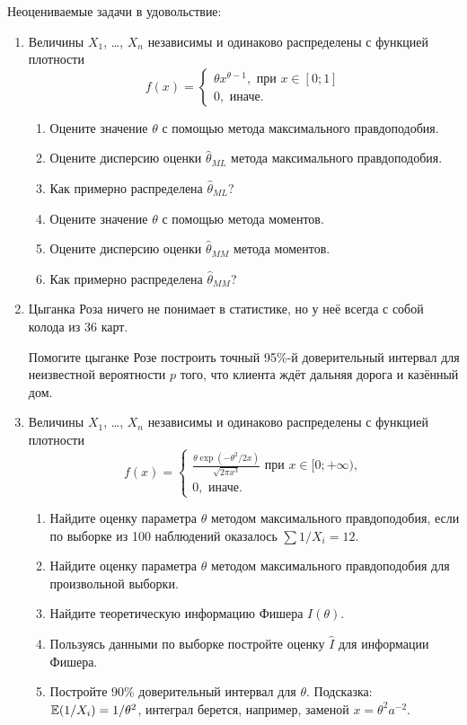 Неоцениваемые задачи в удовольствие:

\begin{enumerate}[resume]
    \item Величины  $X_1$, \ldots, $X_n$ независимы и одинаково распределены с функцией плотности 
    \[
    f(x) = \begin{cases}
      \theta x^{\theta-1}, \text{ при }  x\in [0;1] \\
      0, \text{ иначе.}
    \end{cases}
    \]
    
    \begin{enumerate}
    \item Оцените значение $\theta$ с помощью метода максимального правдоподобия.
    \item Оцените дисперсию оценки $\hat\theta_{ML}$ метода максимального правдоподобия.
    \item Как примерно распределена $\hat \theta_{ML}$?
    \item Оцените значение $\theta$ с помощью метода моментов.
    \item Оцените дисперсию оценки $\hat\theta_{MM}$ метода моментов.
    \item Как примерно распределена $\hat \theta_{MM}$?
    \end{enumerate}
    

    \item Цыганка Роза ничего не понимает в статистике, 
    но у неё всегда с собой колода из 36 карт.
    
    Помогите цыганке Розе построить точный 95\%-й доверительный интервал для
    неизвестной вероятности $p$ того, что клиента ждёт дальняя дорога и казённый дом.
    
\item Величины $X_1$, \ldots , $X_n$ независимы и одинаково распределены с функцией плотности
  \[
  f(x) = \begin{cases}
    \frac{\theta \exp(-\theta^2 / 2x)}{\sqrt{2\pi x^{3}}} \text{ при } x\in [0;+\infty), \\
    0, \text{ иначе.}
  \end{cases}
  \]

\begin{enumerate}

  \item Найдите оценку параметра $\theta$ методом максимального правдоподобия, 
  если по выборке из 100 наблюдений оказалось $\sum{1/X_i}=12$.
  \item Найдите оценку параметра $\theta$ методом максимального правдоподобия для произвольной выборки.
\item Найдите теоретическую информацию Фишера $I(\theta)$.
\item  Пользуясь данными по выборке постройте оценку $\hat{I}$ для информации Фишера.
\item  Постройте 90\% доверительный интервал для $\theta$.
Подсказка: $\operatorname{\mathbb{E}}(1/X_i)=1/\theta^2$, интеграл берется, например, заменой $x=\theta^2a^{-2}$.
\end{enumerate}


\end{enumerate}
